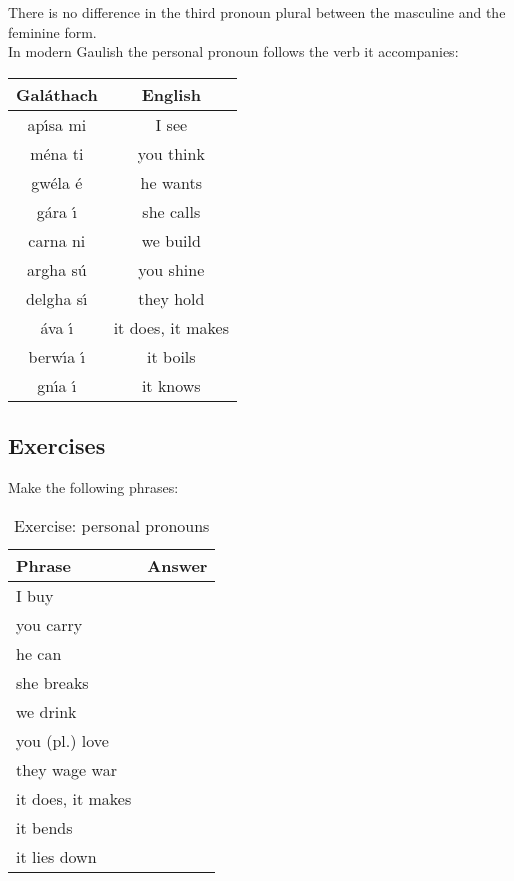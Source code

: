 \noindent There is no difference in the third pronoun plural between the masculine and the feminine form.\\

\noindent In modern Gaulish the personal pronoun follows the verb it accompanies:
\begin{table}[H]
\centering
\begin{tabu}{c|c}
  \textbf{Gal\'{a}thach} & \textbf{English}\\
  \toprule
  ap\'{\i}sa mi & I see\\
  m\'{e}na ti & you think\\
  gw\'{e}la \'{e} & he wants\\
  g\'{a}ra \'{\i} & she calls\\
  carna ni & we build\\
  argha s\'{u} & you shine\\
  delgha s\'{\i} & they hold\\
  \'{a}va \'{\i} & it  does, it makes\\
  berw\'{\i}a \'{\i} & it boils\\
  gn\'{\i}a \'{\i} & it knows\\
\end{tabu}
\label{examples_personal_pronoun}
\end{table}

\subsection{Exercises}

\noindent Make the following phrases:\\
\begin{table}[H]
\centering
\begin{tabu}{|l|p{10.0cm}|}
  \toprule
  \textbf{Phrase} & \textbf{Answer}\\
  \toprule
  I buy & \\
  \midrule
  you carry & \\
  \midrule
  he can & \\
  \midrule
  she breaks & \\
  \midrule
  we drink & \\
  \midrule
  you (pl.) love & \\
  \midrule
  they wage war & \\
  \midrule
  it does, it makes & \\
  \midrule
  it bends & \\
  \midrule
  it lies down & \\
  \bottomrule
\end{tabu}
\label{exercises_personal_pronouns}
\caption{Exercise: personal pronouns}
\end{table}
